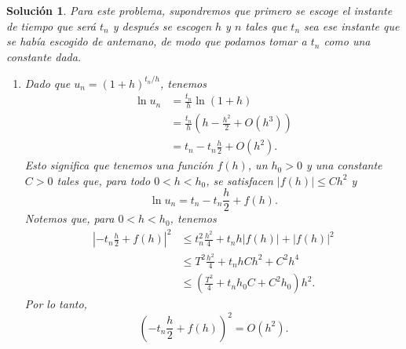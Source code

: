 \documentclass[11pt]{article}
\newtheorem*{sol}{Solución}
\begin{document}
\begin{sol}
  Para este problema, supondremos que \emph{primero} se escoge el
  instante de tiempo que será $t_n$ y \emph{después} se escogen $h$ y
  $n$ tales que $t_n$ sea ese instante que se había escogido de
  antemano, de modo que podamos tomar a $t_n$ como una constante dada.
  \begin{enumerate}
    \item
      Dado que $u_n=(1+h)^{t_n/h}$, tenemos
      \begin{align}
        \ln u_n 
        &= \frac{t_n}{h}\ln(1+h) \\
        &= \frac{t_n}{h}\left(h-\frac{h^{2}}{2} + O(h^{3})\right) \\
        &= t_n - t_n \frac{h}{2} + O(h^{2})
      .\end{align}
      Esto significa que tenemos una función $f(h)$, un $h_0>0$ y una
      constante $C>0$ tales que, para todo $0<h<h_0$, se satisfacen
      $|f(h)|\leq Ch^{2}$ y
      \begin{equation}
        \ln u_n = t_n - t_n \frac{h}{2} + f(h)
      .\end{equation}
      Notemos que, para $0<h<h_0$, tenemos
      \begin{align}
         \left| -t_n \frac{h}{2} + f(h) \right|^{2}
         &\leq t_n^{2} \frac{h^{2}}{4} + t_n h |f(h)| + |f(h)|^{2} \\
         &\leq T^{2} \frac{h^{2}}{4} + t_n h Ch^{2} + C^{2}h^{4} \\
         &\leq
         \left(\frac{T^{2}}{4} + t_n h_0 C + C^{2}h_0 \right)h^{2}
      .\end{align}
      Por lo tanto,
      \begin{equation}
         \left( -t_n \frac{h}{2} + f(h) \right)^{2}
         = O(h^{2})
      .\end{equation}
      

\end{enumerate}
\end{sol}
\end{document}
